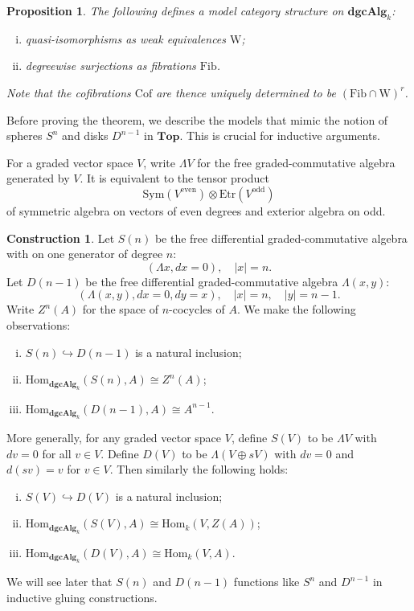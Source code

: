 \documentclass[psamsfonts]{amsart}
\newtheorem{prop}{Proposition}[section]
\theoremstyle{definition}
\newtheorem{con}{Construction}[section]
\newcommand{\Top}{\mathbf{Top}}
\newcommand{\dgcAlg}{\mathbf{dgcAlg}}
\newcommand{\Hom}{\mathrm{Hom}}
\newcommand{\W}{\mathrm{W}}
\newcommand{\Fib}{\mathrm{Fib}}
\newcommand{\Cof}{\mathrm{Cof}}
\numberwithin{equation}{section}
\begin{document}
\begin{prop}
The following defines a model category structure on $\dgcAlg_k$:\begin{enumerate}[(i)]
    \item quasi-isomorphisms as weak equivalences $\W$;
    \item degreewise surjections as fibrations $\Fib$.
\end{enumerate}
Note that the cofibrations $\Cof$ are thence uniquely determined to be
$(\Fib\cap\W)^r$.
\end{prop}

Before proving the theorem, we describe the models that mimic the notion of spheres $S^n$ and disks $D^{n-1}$ in $\Top$. This is crucial for inductive arguments.\medbreak

For a graded vector space $V$, write $\Lambda V$ for the free graded-commutative algebra generated by $V$. It is equivalent to the tensor product
\[\textrm{Sym}(V^\textrm{even})\otimes\textrm{Etr}(V^\textrm{odd})\]
of symmetric algebra on vectors of even degrees and exterior algebra on odd.

\begin{con}
Let $S(n)$ be the free differential graded-commutative algebra with on one generator of degree $n$:
\[(\Lambda x,dx=0),\quad|x|=n.\] Let $D(n-1)$ be the free differential graded-commutative algebra $\Lambda(x,y)$:
\[(\Lambda(x,y),dx=0,dy=x),\quad|x|=n,\quad|y|=n-1.\]
Write $Z^n(A)$ for the space of $n$-cocycles of $A$. We make the following observations:\begin{enumerate}[(i)]
    \item $S(n)\hookrightarrow D(n-1)$ is a natural inclusion;
    \item $\Hom_{\dgcAlg_k}(S(n),A)\cong Z^n(A)$;
    \item $\Hom_{\dgcAlg_k}(D(n-1),A)\cong A^{n-1}$.
\end{enumerate}
More generally, for any graded vector space $V$, define $S(V)$ to be $\Lambda V$ with $dv=0$ for all $v\in V$. Define $D(V)$ to be $\Lambda(V\oplus sV)$ with $dv=0$ and $d(sv)=v$ for $v\in V$. Then similarly the following holds:\begin{enumerate}[(i)]
    \item $S(V)\hookrightarrow D(V)$ is a natural inclusion;
    \item $\Hom_{\dgcAlg_k}(S(V),A)\cong\Hom_k(V,Z(A))$;
    \item $\Hom_{\dgcAlg_k}(D(V),A)\cong\Hom_k(V,A)$.
\end{enumerate}
We will see later that $S(n)$ and $D(n-1)$ functions like $S^n$ and $D^{n-1}$ in inductive gluing constructions.
\end{con}
\end{document}
